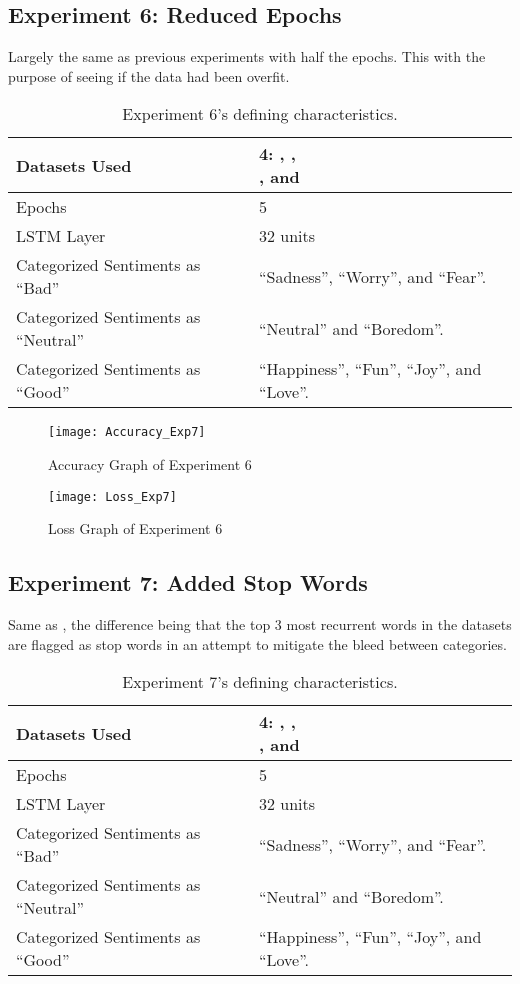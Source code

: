 \subsection{Experiment 6: Reduced Epochs}
\label{exp7}
Largely the same as previous experiments with half the epochs. This with the purpose of seeing if the data had been overfit.
\begin{table}[!h]
	\caption{Experiment 6's defining characteristics.}
	\vspace{0.5cm}
	\centering
	\begin{tabular}[t]{|l|l|}
	\hline
		Datasets Used & \makecell{4: \citet{d1}, \citet{d2},\\ \citet{d3}, and \citet{d4}}
	\\ \hline
		Epochs & 5
	\\ \hline
		LSTM Layer & 32 units
	\\ \hline
		Categorized Sentiments as ``Bad'' & ``Sadness'', ``Worry'', and ``Fear''.
	\\ \hline	
		 Categorized Sentiments as ``Neutral'' & ``Neutral'' and ``Boredom''.
	\\ \hline	
		Categorized Sentiments as ``Good'' & ``Happiness'', ``Fun'', ``Joy'', and ``Love''.
	\\ \hline
	\end{tabular}
\end{table}


\begin{figure}[!h]
	\centering
	\texttt{[image: Accuracy\_Exp7]}
	\caption{Accuracy Graph of Experiment 6}
	\label{fig:accuracy_exp7}
	\texttt{[image: Loss\_Exp7]}
	\caption{Loss Graph of Experiment 6}
	\label{fig:loss_exp7}
\end{figure}
\pagebreak

\subsection{Experiment 7: Added Stop Words}
\label{exp8}
Same as , the difference being that the top 3 most recurrent words in the datasets are flagged as stop words in an attempt to mitigate the bleed between categories.
\begin{table}[!h]
	\caption{Experiment 7's defining characteristics.}
	\vspace{0.5cm}
	\centering
	\begin{tabular}[t]{|l|l|}
	\hline
		Datasets Used & \makecell{4: \citet{d1}, \citet{d2},\\ \citet{d3}, and \citet{d4}}
	\\ \hline
		Epochs & 5
	\\ \hline
		LSTM Layer & 32 units
	\\ \hline
		Categorized Sentiments as ``Bad'' & ``Sadness'', ``Worry'', and ``Fear''.
	\\ \hline	
		 Categorized Sentiments as ``Neutral'' & ``Neutral'' and ``Boredom''.
	\\ \hline	
		Categorized Sentiments as ``Good'' & ``Happiness'', ``Fun'', ``Joy'', and ``Love''.
	\\ \hline
	\end{tabular}
\end{table}


